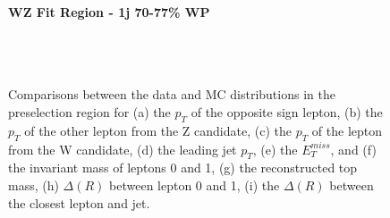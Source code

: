 \begin{figure}[H] 
    \centering
    \textbf{WZ Fit Region - 1j 70-77\% WP}\\
    \\
    \\
    \\
    \caption{Comparisons between the data and MC distributions in the preselection region for (a) the $p_T$ of the opposite sign lepton, (b) the $p_T$ of the other lepton from the Z candidate, (c) the $p_T$ of the lepton from the W candidate, (d) the leading jet $p_T$, (e) the $E_T^{miss}$, and (f) the invariant mass of leptons 0 and 1, (g) the reconstructed top mass, (h) $\Delta(R)$  between lepton 0 and 1, (i) the $\Delta(R)$ between the closest lepton and jet.}
    \label{kin:WP_1j_70_77}   
\end{figure}

